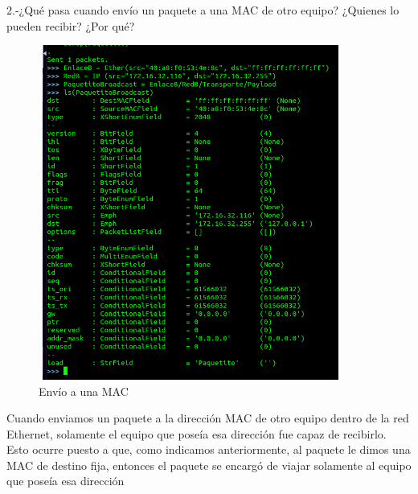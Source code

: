 \documentclass{udpreport}
\begin{document}
  	  2.-¿Qué pasa cuando envío un paquete a una MAC de otro equipo? ¿Quienes lo
  	      pueden recibir? ¿Por qué?\\
    		\begin{figure}[h]
  	        	\centering
  	          	\includegraphics[width=10cm, height=11cm]{EnvioPaquetitoMalo2.png}
  	          	\caption{Envío a una MAC}
  		\end{figure}
 	      
 	      Cuando enviamos un paquete a la dirección MAC de otro equipo dentro de la red Ethernet, solamente el equipo que poseía
 	      esa dirección fue capaz de recibirlo. Esto ocurre puesto a que, como indicamos anteriormente, al paquete le dimos una
 	      MAC de destino fija, entonces el paquete se encargó de viajar solamente al equipo que poseía esa dirección\\
 
\end{document}
